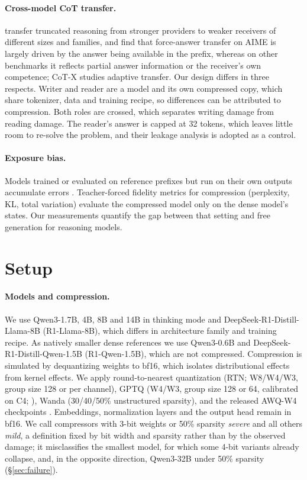 \documentclass[10pt]{article}
\begin{document}
\paragraph{Cross-model CoT transfer.}
\citet{cheng2026travels} transfer truncated reasoning from stronger providers to weaker receivers of different sizes and families, and find that force-answer transfer on AIME is largely driven by the answer being available in the prefix, whereas on other benchmarks it reflects partial answer information or the receiver's own competence; CoT-X \citep{bi2025cotx} studies adaptive transfer. Our design differs in three respects. Writer and reader are a model and its own compressed copy, which share tokenizer, data and training recipe, so differences can be attributed to compression. Both roles are crossed, which separates writing damage from reading damage. The reader's answer is capped at 32 tokens, which leaves little room to re-solve the problem, and their leakage analysis is adopted as a control.

\paragraph{Exposure bias.}
Models trained or evaluated on reference prefixes but run on their own outputs accumulate errors \citep{bengio2015scheduled,ross2010efficient,ross2011dagger}. Teacher-forced fidelity metrics for compression (perplexity, KL, total variation) evaluate the compressed model only on the dense model's states. Our measurements quantify the gap between that setting and free generation for reasoning models.

\section{Setup}
\label{sec:setup}

\paragraph{Models and compression.}
We use Qwen3-1.7B, 4B, 8B and 14B in thinking mode \citep{yang2025qwen3} and DeepSeek-R1-Distill-Llama-8B \citep{deepseek2025r1} (R1-Llama-8B), which differs in architecture family and training recipe. As natively smaller dense references we use Qwen3-0.6B and DeepSeek-R1-Distill-Qwen-1.5B (R1-Qwen-1.5B), which are not compressed. Compression is simulated by dequantizing weights to bf16, which isolates distributional effects from kernel effects. We apply round-to-nearest quantization (RTN; W8/W4/W3, group size 128 or per channel), GPTQ \citep{frantar2023gptq} (W4/W3, group size 128 or 64, calibrated on C4; \citealp{raffel2020t5}), Wanda \citep{sun2024wanda} (30/40/50\% unstructured sparsity), and the released AWQ-W4 checkpoints \citep{lin2024awq}. Embeddings, normalization layers and the output head remain in bf16. We call compressors with 3-bit weights or 50\% sparsity \emph{severe} and all others \emph{mild}, a definition fixed by bit width and sparsity rather than by the observed damage; it misclassifies the smallest model, for which some 4-bit variants already collapse, and, in the opposite direction, Qwen3-32B under 50\% sparsity (\S\ref{sec:failure}).
\end{document}
